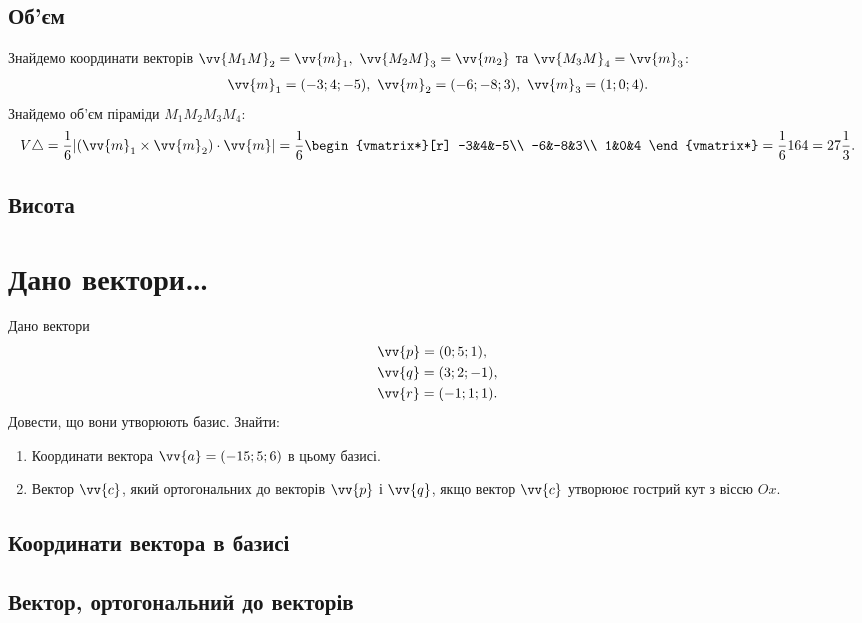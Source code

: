 \subsection{Об'єм}
\solving
Знайдемо координати векторів \(\vv{M_1M}_2=\vv{m}_1,\ \vv{M_2M}_3=\vv{m_2}\) та \(\vv{M_3M}_4=\vv{m}_3\):
\begin{gather}
	\vv{m}_1=(-3;4;-5),\ \vv{m}_2=(-6;-8;3),\ \vv{m}_3=(1;0;4).
\end{gather}
Знайдемо об'єм піраміди \(M_1M_2M_3M_4\):
\begin{gather}
	V\triangle=\frac{1}{6}\lvert(\vv{m}_1\times \vv{m}_2)\cdot\vv{m}\rvert=\frac{1}{6}\begin{vmatrix*}[r]
		-3&4&-5\\
		-6&-8&3\\
		1&0&4
	\end{vmatrix*}=\frac{1}{6}164=27\frac{1}{3}.
\end{gather}

\subsection{Висота}


\section{Дано вектори\dots}
Дано вектори 
\begin{align}
	&\vv{p} = (0;5;1),\\ 
	&\vv{q} = (3;2;-1),\\ 
	&\vv{r} = (-1;1;1).
\end{align}
Довести, що вони утворюють базис. Знайти:
\begin{enumerate}
	\item Координати вектора \(\vv{a}=(-15;5;6)\) в цьому базисі.
	\item Вектор \(\vv{c}\), який ортогональних до векторів \(\vv{p}\) і \(\vv{q}\), якщо вектор \(\vv{c}\) утворюює гострий кут з віссю \(Ox\).
\end{enumerate}
\subsection{Координати вектора в базисі}
\solving


\ansver
\subsection{Вектор, ортогональний до векторів}
\solving



